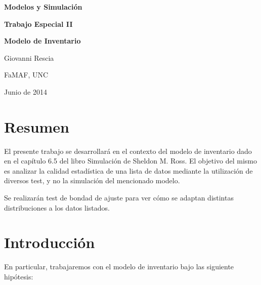 \documentclass[a4paper,10pt]{article}
\begin{document}
\begin{titlepage}
\begin{center}
\vspace*{1.5in}
\begin{Large}
\textbf{Modelos y Simulación}
\vspace{0.5in}

\textbf{Trabajo Especial II}

\vspace{0.3in}
\textbf{Modelo de Inventario}

\vspace{1.5in}
Giovanni Rescia

\vspace*{0.4in}

FaMAF, UNC
\vspace*{.13in}

Junio de 2014
\end{Large}
\end{center}
\end{titlepage}

\author{Giovanni Rescia \\ \\ \large FaMAF}
\date{21 de Mayo de 2014}

\pagebreak

\section*{Resumen}
\vspace{0.4in}
El presente trabajo se desarrollará en el contexto del modelo de inventario dado en el capítulo 6.5 del
libro Simulación de Sheldon M. Ross. El objetivo del mismo es analizar la calidad estadística de una lista
de datos mediante la utilización de diversos test, y no la simulación del mencionado modelo.

Se realizarán test de bondad de ajuste para ver cómo se adaptan distintas distribuciones a los datos listados.

\pagebreak

\section*{Introducción}
\vspace{0.4in}

En particular, trabajaremos con el modelo de inventario bajo las siguiente hipótesis:
\end{document}
